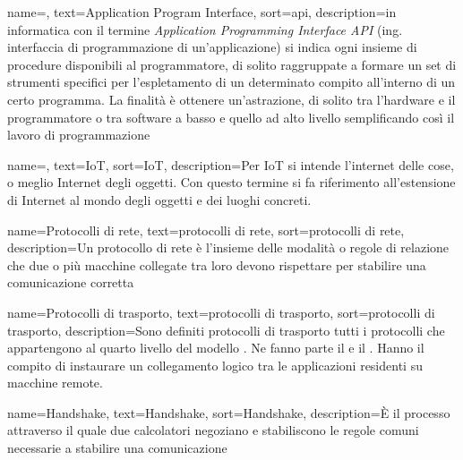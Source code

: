 





 {
    name=,
    text=Application Program Interface,
    sort=api,
    description={in informatica con il termine \emph{Application Programming Interface API} (ing. interfaccia di programmazione di un'applicazione) si indica ogni insieme di procedure disponibili al programmatore, di solito raggruppate a formare un set di strumenti specifici per l'espletamento di un determinato compito all'interno di un certo programma. La finalità è ottenere un'astrazione, di solito tra l'hardware e il programmatore o tra software a basso e quello ad alto livello semplificando così il lavoro di programmazione}
}

 {
    name=,
    text=IoT,
    sort=IoT,
    description={Per IoT si intende l'internet delle cose, o meglio Internet degli oggetti. Con questo termine si fa riferimento all'estensione di Internet al mondo degli oggetti e dei luoghi concreti. }
}

 {
    name=Protocolli di rete,
    text=protocolli di rete,
    sort=protocolli di rete,
    description={Un protocollo di rete è l'insieme delle modalità o regole di relazione che due o più macchine collegate tra loro devono rispettare per stabilire una comunicazione corretta}
}

 {
    name=Protocolli di trasporto,
    text=protocolli di trasporto,
    sort=protocolli di trasporto,
    description={Sono definiti protocolli di trasporto tutti i protocolli che appartengono al quarto livello del modello . Ne fanno parte il  e il . Hanno il compito di instaurare un collegamento logico tra le applicazioni residenti su macchine remote. }
}

 {
    name=Handshake,
    text=Handshake,
    sort=Handshake,
    description={È il processo attraverso il quale due calcolatori negoziano e stabiliscono le regole comuni necessarie a stabilire una comunicazione}
}
